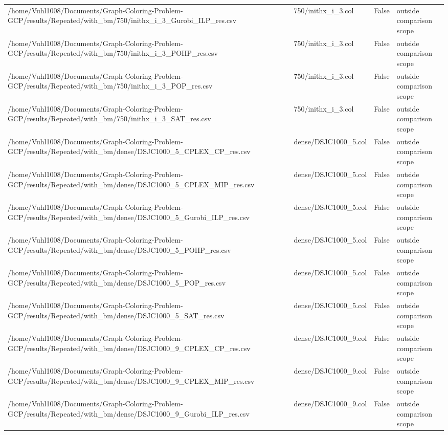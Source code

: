\begin{table}[htbp]
\begin{tabular}{llll}
/home/Vuhl1008/Documents/Graph-Coloring-Problem-GCP/results/Repeated/with\_bm/750/inithx\_i\_3\_Gurobi\_ILP\_res.csv & 750/inithx\_i\_3.col & False & outside comparison scope \\
/home/Vuhl1008/Documents/Graph-Coloring-Problem-GCP/results/Repeated/with\_bm/750/inithx\_i\_3\_POHP\_res.csv & 750/inithx\_i\_3.col & False & outside comparison scope \\
/home/Vuhl1008/Documents/Graph-Coloring-Problem-GCP/results/Repeated/with\_bm/750/inithx\_i\_3\_POP\_res.csv & 750/inithx\_i\_3.col & False & outside comparison scope \\
/home/Vuhl1008/Documents/Graph-Coloring-Problem-GCP/results/Repeated/with\_bm/750/inithx\_i\_3\_SAT\_res.csv & 750/inithx\_i\_3.col & False & outside comparison scope \\
/home/Vuhl1008/Documents/Graph-Coloring-Problem-GCP/results/Repeated/with\_bm/dense/DSJC1000\_5\_CPLEX\_CP\_res.csv & dense/DSJC1000\_5.col & False & outside comparison scope \\
/home/Vuhl1008/Documents/Graph-Coloring-Problem-GCP/results/Repeated/with\_bm/dense/DSJC1000\_5\_CPLEX\_MIP\_res.csv & dense/DSJC1000\_5.col & False & outside comparison scope \\
/home/Vuhl1008/Documents/Graph-Coloring-Problem-GCP/results/Repeated/with\_bm/dense/DSJC1000\_5\_Gurobi\_ILP\_res.csv & dense/DSJC1000\_5.col & False & outside comparison scope \\
/home/Vuhl1008/Documents/Graph-Coloring-Problem-GCP/results/Repeated/with\_bm/dense/DSJC1000\_5\_POHP\_res.csv & dense/DSJC1000\_5.col & False & outside comparison scope \\
/home/Vuhl1008/Documents/Graph-Coloring-Problem-GCP/results/Repeated/with\_bm/dense/DSJC1000\_5\_POP\_res.csv & dense/DSJC1000\_5.col & False & outside comparison scope \\
/home/Vuhl1008/Documents/Graph-Coloring-Problem-GCP/results/Repeated/with\_bm/dense/DSJC1000\_5\_SAT\_res.csv & dense/DSJC1000\_5.col & False & outside comparison scope \\
/home/Vuhl1008/Documents/Graph-Coloring-Problem-GCP/results/Repeated/with\_bm/dense/DSJC1000\_9\_CPLEX\_CP\_res.csv & dense/DSJC1000\_9.col & False & outside comparison scope \\
/home/Vuhl1008/Documents/Graph-Coloring-Problem-GCP/results/Repeated/with\_bm/dense/DSJC1000\_9\_CPLEX\_MIP\_res.csv & dense/DSJC1000\_9.col & False & outside comparison scope \\
/home/Vuhl1008/Documents/Graph-Coloring-Problem-GCP/results/Repeated/with\_bm/dense/DSJC1000\_9\_Gurobi\_ILP\_res.csv & dense/DSJC1000\_9.col & False & outside comparison scope \\

\end{tabular}
\end{table}

